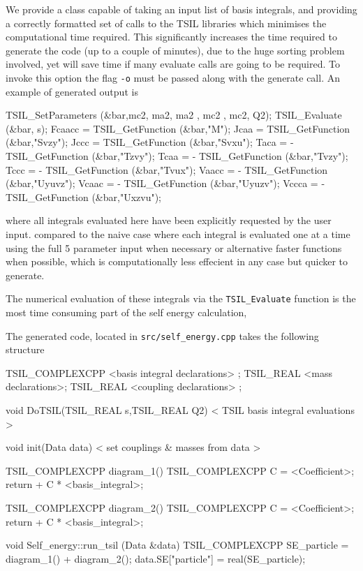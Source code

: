 We provide a class capable of taking an input list of basis integrals, and providing a correctly formatted set of calls to the TSIL libraries which minimises the computational time required.  This significantly increases the time required to generate the code (up to a couple of minutes), due to the huge sorting problem involved, yet will save time if many evaluate calls are going to be required.  To invoke this option the flag \lstinline{-o} must be passed along with the generate call.  An example of generated output is

\begin{lstcpp}
TSIL_SetParameters (&bar,mc2, ma2, ma2 , mc2 , mc2, Q2);
TSIL_Evaluate (&bar, s);
Fcaacc =   TSIL_GetFunction (&bar,"M");
Jcaa   =   TSIL_GetFunction (&bar,"Svzy");
Jccc   =   TSIL_GetFunction (&bar,"Svxu");
Taca   = - TSIL_GetFunction (&bar,"Tzvy");
Tcaa   = - TSIL_GetFunction (&bar,"Tvzy");
Tccc   = - TSIL_GetFunction (&bar,"Tvux");
Vaacc  = - TSIL_GetFunction (&bar,"Uyuvz");
Vcaac  = - TSIL_GetFunction (&bar,"Uyuzv");
Vccca  = - TSIL_GetFunction (&bar,"Uxzvu");
\end{lstcpp}
where all integrals evaluated here have been explicitly requested by the user input.
compared to the naive case where each integral is evaluated one at a time using the full 5 parameter input when necessary or alternative faster functions when possible, which is computationally less effecient in any case but quicker to generate.

The numerical evaluation of these integrals via the \lstinline{TSIL_Evaluate} function is the most time consuming part of the self energy calculation,

The generated code, located in \lstinline{src/self_energy.cpp} takes the following structure
\begin{lstcpp}
TSIL_COMPLEXCPP  <basis integral declarations> ;
TSIL_REAL  <mass declarations>;
TSIL_REAL  <coupling declarations> ;

void DoTSIL(TSIL_REAL s,TSIL_REAL Q2)
{
< TSIL basis integral evaluations >
}

void init(Data data) 
{
< set couplings & masses from data >
}

TSIL_COMPLEXCPP  diagram_1()
{
TSIL_COMPLEXCPP C =  <Coefficient>;
return  + C * <basis_integral>;
}

TSIL_COMPLEXCPP  diagram_2()
{
TSIL_COMPLEXCPP C =  <Coefficient>;
return  + C * <basis_integral>;
}

void Self_energy::run_tsil (Data &data) 
{
TSIL_COMPLEXCPP SE_particle = diagram_1() + diagram_2();
data.SE["particle"] = real(SE_particle);
}
\end{lstcpp}

